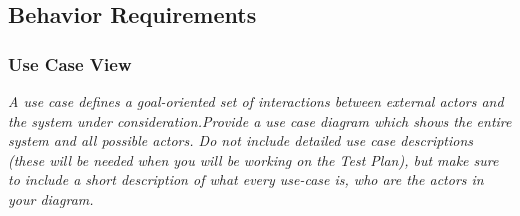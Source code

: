     \subsection{Behavior Requirements}\label{sec:behavior-requirements}
        \subsubsection{Use Case View}\label{sec:use-case-view}
            \emph{A use case defines a goal-oriented set of interactions between external actors and the system under consideration.\gnl Provide a use case diagram which shows the entire system and all possible actors. Do not include detailed use case descriptions (these will be needed when you will be working on the Test Plan), but make sure to include a short description of what every use-case is, who are the actors in your diagram.}
